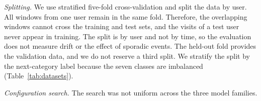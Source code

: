 \emph{Splitting.} We use stratified five-fold cross-validation and split the data by user. All windows from one user remain in the same fold. Therefore, the overlapping windows cannot cross the training and test sets, and the visits of a test user never appear in training. The split is by user and not by time, so the evaluation does not measure drift or the effect of sporadic events. The held-out fold provides the validation data, and we do not reserve a third split. We stratify the split by the next-category label because the seven classes are imbalanced (Table~\ref{tab:datasets}).

\emph{Configuration search.} The search was not uniform across the three model families.
